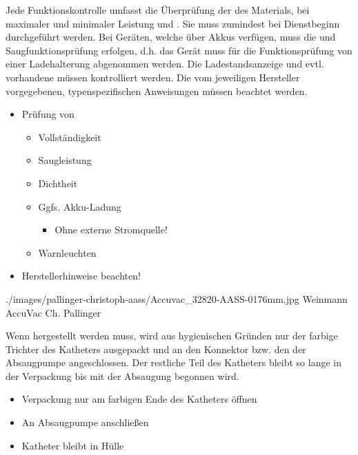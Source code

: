 {\TakeNotesBoxLarge}

% 
% 

{%
Jede Funktionskontrolle umfasst die Überprüfung der
 des Materials,  bei
maximaler und minimaler Leistung und . Sie muss
zumindest bei Dienstbeginn durchgeführt werden.
Bei Geräten, welche über Akkus verfügen, muss die
 und Saugfunktionsprüfung  erfolgen, d.h. das Gerät muss
für die Funktionsprüfung von einer Ladehalterung abgenommen
werden. Die Ladestandsanzeige und evtl. vorhandene
 müssen kontrolliert werden.
Die vom jeweiligen Hersteller vorgegebenen,
typenspezifischen Anweisungen müssen beachtet werden. 
}{
\begin{itemize}
   \item Prüfung von
   \begin{itemize}
      \item Vollständigkeit
      \item Saugleistung
      \item Dichtheit
      \item Ggfs. Akku-Ladung
      \begin{itemize}
         \item Ohne externe Stromquelle!
      \end{itemize}
      \item Warnleuchten
   \end{itemize}
   \item Herstellerhinweise beachten!
\end{itemize}
}{}{}{}



{}
{}
{./images/pallinger-christoph-aass/Accuvac_32820-AASS-0176mm.jpg}
{Weinmann AccuVac{\protect\texttrademark}}
{Ch. Pallinger}




{%
Wenn  hergestellt werden muss, wird
aus hygienischen Gründen nur der farbige Trichter des
Katheters ausgepackt und an den Konnektor bzw. den
 der Absaugpumpe angeschlossen. Der restliche
Teil des Katheters bleibt so lange in der Verpackung bis mit
der Absaugung begonnen
wird.\bigskip}{
\begin{itemize}
  \item Verpackung nur am farbigen Ende des Katheters öffnen
  \item An Absaugpumpe anschließen
  \item Katheter bleibt in Hülle
\end{itemize}
}
{}
{}
{}

